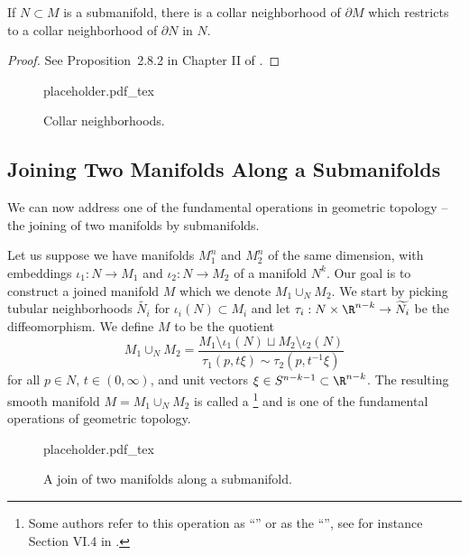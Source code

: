 \begin{proposition}
	If $N\subset M$ is a submanifold, there is a collar neighborhood of $\partial M$ which restricts to a collar neighborhood of $\partial N$ in $N$.
\end{proposition}
\begin{proof}
	See Proposition~2.8.2 in Chapter II of \cite{kosinski1993differential}.
\end{proof}

\begin{figure}[ht]
	\centering
	{placeholder.pdf_tex}
	\caption{Collar neighborhoods.}\label{fig:collar-neighborhoods}
\end{figure}

\subsection{Joining Two Manifolds Along a Submanifolds}

We can now address one of the fundamental operations in geometric topology -- the joining of two manifolds by submanifolds.

Let us suppose we have manifolds $M_1^n$ and $M_2^n$ of the same dimension, with embeddings $\iota_1 : N\to M_1$ and $\iota_2 : N\to M_2$ of a manifold $N^k$. Our goal is to construct a joined manifold $M$ which we denote $M_1\cup_N M_2$.
We start by picking tubular neighborhoods $\widetilde{N_i}$ for $\iota_i(N)\subset M_i$ and let $\tau_i: N\times \R^{n-k} \to \widetilde{N_i}$ be the diffeomorphism.
We define $M$ to be the quotient
\begin{equation}\label{eq:join-definition}
	M_1\cup_N M_2 = \frac{M_1\setminus \iota_1(N)\sqcup M_2\setminus \iota_2(N)}{\tau_1(p, t\xi) \sim \tau_2(p, t^{-1}\xi)}
\end{equation}
for all $p\in N$, $t\in(0,\infty)$, and unit vectors $\xi\in S^{n-k-1}\subset \R^{n-k}$. The resulting smooth manifold $M=M_1\cup_N M_2$ is called a \footnote{Some authors refer to this operation as ``'' or as the ``'', see for instance Section VI.4 in \cite{kosinski1993differential}.} and is one of the fundamental operations of geometric topology.

\begin{figure}[ht]
	\centering
	{placeholder.pdf_tex}
	\caption{A join of two manifolds along a submanifold.}\label{fig:join-along-submanifold}
\end{figure}

